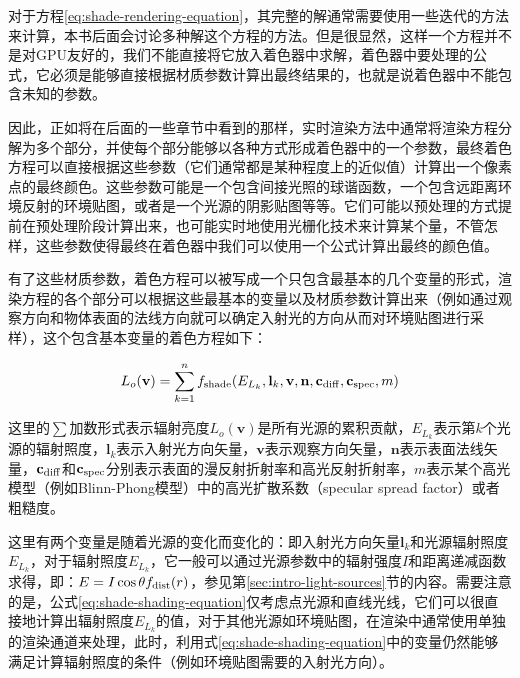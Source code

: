 对于方程\ref{eq:shade-rendering-equation}，其完整的解通常需要使用一些迭代的方法来计算，本书后面会讨论多种解这个方程的方法。但是很显然，这样一个方程并不是对GPU友好的，我们不能直接将它放入着色器中求解，着色器中要处理的公式，它必须是能够直接根据材质参数计算出最终结果的，也就是说着色器中不能包含未知的参数。

因此，正如将在后面的一些章节中看到的那样，实时渲染方法中通常将渲染方程分解为多个部分，并使每个部分能够以各种方式形成着色器中的一个参数，最终着色方程可以直接根据这些参数（它们通常都是某种程度上的近似值）计算出一个像素点的最终颜色。这些参数可能是一个包含间接光照的球谐函数，一个包含远距离环境反射的环境贴图，或者是一个光源的阴影贴图等等。它们可能以预处理的方式提前在预处理阶段计算出来，也可能实时地使用光栅化技术来计算某个量，不管怎样，这些参数使得最终在着色器中我们可以使用一个公式计算出最终的颜色值。

有了这些材质参数，着色方程可以被写成一个只包含最基本的几个变量的形式，渲染方程的各个部分可以根据这些最基本的变量以及材质参数计算出来（例如通过观察方向和物体表面的法线方向就可以确定入射光的方向从而对环境贴图进行采样），这个包含基本变量的着色方程如下：

\begin{equation}\label{eq:shade-shading-equation}
	L_{o}(\mathbf{v})=\sum^{n}_{k=1}f_{\rm shade}(E_{L_k},\mathbf{l}_k,\mathbf{v},\mathbf{n},\mathbf{c}_{\rm diff},\mathbf{c}_{\rm spec},m)
\end{equation}

这里的$\sum$加数形式表示辐射亮度$L_o(\mathbf{v})$是所有光源的累积贡献，$E_{L_k}$表示第$k$个光源的辐射照度，$\mathbf{l}_k$表示入射光方向矢量，$\mathbf{v}$表示观察方向矢量，$\mathbf{n}$表示表面法线矢量，$\mathbf{c}_{\rm diff}$和$\mathbf{c}_{\rm spec}$分别表示表面的漫反射折射率和高光反射折射率，$m$表示某个高光模型（例如Blinn-Phong模型）中的高光扩散系数（specular spread factor）或者粗糙度。

这里有两个变量是随着光源的变化而变化的：即入射光方向矢量$\mathbf{l}_k$和光源辐射照度$E_{L_k}$，对于辐射照度$E_{L_k}$，它一般可以通过光源参数中的辐射强度$I$和距离递减函数求得，即：$E=I\cos{\theta}f_{\rm dist}(r)$，参见第\ref{sec:intro-light-sources}节的内容。需要注意的是，公式\ref{eq:shade-shading-equation}仅考虑点光源和直线光线，它们可以很直接地计算出辐射照度$E_{L_k}$的值，对于其他光源如环境贴图，在渲染中通常使用单独的渲染通道来处理，此时，利用式\ref{eq:shade-shading-equation}中的变量仍然能够满足计算辐射照度的条件（例如环境贴图需要的入射光方向）。

